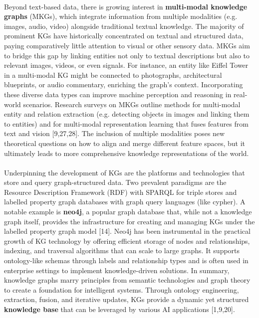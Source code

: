         \paragraph{}
        Beyond text-based data, there is growing interest in \textbf{multi-modal knowledge graphs} (MKGs), which integrate information from multiple modalities (e.g. images, audio, video) alongside traditional textual knowledge. The majority of prominent KGs have historically concentrated on textual and structured data, paying comparatively little attention to visual or other sensory data. MKGs aim to bridge this gap by linking entities not only to textual descriptions but also to relevant images, videos, or even signals. For instance, an entity like Eiffel Tower in a multi-modal KG might be connected to photographs, architectural blueprints, or audio commentary, enriching the graph’s context. Incorporating these diverse data types can improve machine perception and reasoning in real-world scenarios. Research surveys on MKGs outline methods for multi-modal entity and relation extraction (e.g. detecting objects in images and linking them to entities) and for multi-modal representation learning that fuses features from text and vision [9,27,28]. The inclusion of multiple modalities poses new theoretical questions on how to align and merge different feature spaces, but it ultimately leads to more comprehensive knowledge representations of the world.

        \paragraph{}
        Underpinning the development of KGs are the platforms and technologies that store and query graph-structured data. Two prevalent paradigms are the Resource Description Framework (RDF) with SPARQL for triple stores and labelled property graph databases with graph query languages (like cypher). A notable example is \textbf{neo4j}, a popular graph database that, while not a knowledge graph itself, provides the infrastructure for creating and managing KGs under the labelled property graph model [14]. Neo4j has been instrumental in the practical growth of KG technology by offering efficient storage of nodes and relationships, indexing, and traversal algorithms that can scale to large graphs. It supports ontology-like schemas through labels and relationship types and is often used in enterprise settings to implement knowledge-driven solutions. In summary, knowledge graphs marry principles from semantic technologies and graph theory to create a foundation for intelligent systems. Through ontology engineering, extraction, fusion, and iterative updates, KGs provide a dynamic yet structured \textbf{knowledge base} that can be leveraged by various AI applications [1,9,20].

